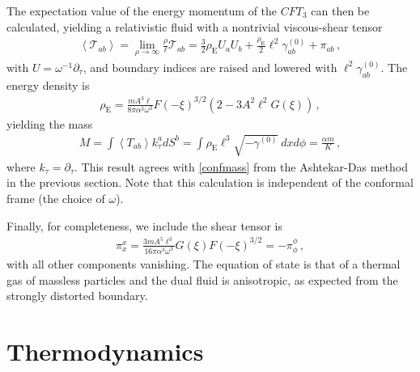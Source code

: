 \documentclass[
twoside,
openright,
frontopenright,
]{dmathesis}
\newcommand{\tcr}{\textcolor{red}}
\begin{document}
The expectation value of the energy momentum of the $CFT_{3}$ can then be
calculated, yielding a relativistic fluid with a nontrivial viscous-shear
tensor
\begin{align}
\left\langle \mathcal{T}_{ab}\right\rangle =\lim_{\rho \to
\infty }\frac{\rho }{\ell}\mathcal{T}_{ab}= \frac32 \rho _{\mathrm{E}}
U_{a}U_{b}+\frac{\rho_\mathrm{E}}2 \ell^{2} \gamma^{(0)} _{ab}+\pi _{ab}\,,
\end{align}
with $U=\omega^{-1}\partial_\tau$, and boundary indices are
raised and lowered with $\ell^{2}\gamma^{(0)}_{ab}$.
The energy density is
\begin{align}
\rho _{\mathrm{E}}= \frac{mA^3\ell}{8\pi \alpha^3\omega^3}F(-\xi)^{3/2}
(2-3A^{2}\ell^{2}G(\xi))\,,
\end{align}
yielding the mass
\begin{align}
M= \int \left\langle T_{ab}\right\rangle k_\tau^a dS^b = \int \rho _{\mathrm{E}} \ell^3 \sqrt{-\gamma^{(0)}}~dxd\phi
=\frac{\alpha m}{K}\,,
\end{align}
where $k_\tau = \partial_\tau$. This result agrees with \cref{confmass} from the
Ashtekar-Das method in the previous section. Note that this calculation is
independent of the conformal frame (the choice of $\omega$).

Finally, for completeness, we include the shear tensor is
\begin{align}
\pi^x_x= \frac{3mA^5\ell^3}{16\pi \alpha^3\omega^{3}}
G(\xi)F(-\xi)^{3/2}=-\pi^\phi_\phi\,,
\end{align}
with all other components vanishing. The equation of state is that of a thermal
gas of massless particles and the dual fluid is anisotropic, as expected from
the strongly distorted boundary.

\section{Thermodynamics}
\label{sec:thermodynamics}
\end{document}
